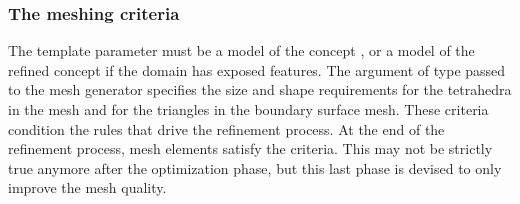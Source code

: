 
\subsubsection{The meshing criteria}
The template parameter  must be a model of the concept
, or a model of  the refined concept 
if the domain has exposed features.
The argument of
type  passed to the mesh generator specifies the
size and shape requirements for the tetrahedra in the mesh
and for the triangles in the boundary surface mesh. These criteria
condition the rules that drive the refinement process.  At the end 
of the refinement process, mesh elements satisfy the criteria.
This may not be strictly true anymore after the optimization phase, but this
last phase is devised to only improve the mesh quality.

